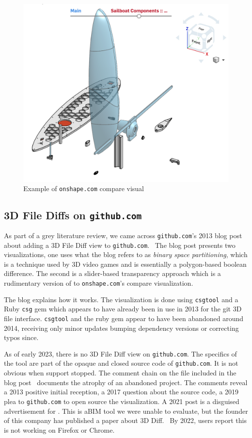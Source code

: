 \documentclass[sigconf,authorversion,nonacm]{acmart}
\begin{document}
\begin{figure}[t]
	\includegraphics[width=\linewidth]{onshapescreenshot.png}
	\caption{Example of \texttt{onshape.com} compare visual}
	\label{fig:onshapescreenshot}
\end{figure}

\subsection{3D File Diffs on \texttt{github.com}}

As part of a grey literature review, we came across \texttt{github.com}'s 2013 blog post about adding a 3D File Diff view to \texttt{github.com}.~\cite{github_blog_2013}
The blog post presents two visualizations, one uses what the blog refers to as \emph{binary space partitioning}, which is a technique used by 3D video games and is essentially a polygon-based boolean difference.
The second is a slider-based transparency approach which is a rudimentary version of to \texttt{onshape.com}'s compare visualization.

The blog explains how it works.
The visualization is done using \texttt{csgtool} and a Ruby \texttt{csg} gem which appears to have already been in use in 2013 for the git 3D file interface.
\texttt{csgtool} and the ruby gem appear to have been abandoned around 2014, receiving only minor updates bumping dependency versions or correcting typos since.

As of early 2023, there is no 3D File Diff view on \texttt{github.com}.
The specifics of the tool are part of the opaque and closed source code of \texttt{github.com}.
It is not obvious when support stopped.
The comment chain on the file included in the blog post~\cite{death_of_a_diffsman} documents the atrophy of an abandoned project.
The comments reveal a 2013 positive initial reception, a 2017 question about the source code, a 2019 plea to \texttt{github.com} to open source the visualization.
A 2021 post is a disguised advertisement for \citet{3drepoblog}.
This is aBIM tool we were unable to evaluate, but the founder of this company has published a paper about 3D Diff.~\cite{Dobos}
By 2022, users report this is not working on Firefox or Chrome.
\end{document}
